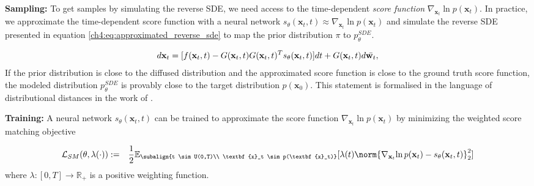 \textbf{Sampling:} To get samples by simulating the reverse SDE, we need access to the time-dependent \textit{score function} $\nabla_{\textbf{x}_t}{\ln{p(\textbf{x}_t)}}$. In practice, we approximate the time-dependent score function with a neural network $s_{\theta}(\textbf{x}_t,t) \approx \nabla_{\textbf{x}_t}{\ln{p(\textbf{x}_t)}}$ and simulate the reverse SDE presented in equation \ref{ch4:eq:approximated_reverse_sde} to map the prior distribution $\pi$ to $p^{SDE}_{\theta}$.

\begin{gather}\label{ch4:eq:approximated_reverse_sde}
d\textbf{x}_t=[f(\textbf{x}_t,t)-G(\textbf{x}_t,t)G(\textbf{x}_t,t)^Ts_{\theta}(\textbf{x}_t,t)]dt + G(\textbf{x}_t,t)d\Bar{\textbf{w}_t},
\end{gather}If the prior distribution is close to the diffused distribution and the approximated score function is close to the ground truth score function, the modeled distribution  $p^{SDE}_{\theta}$ is provably close to the target distribution $p(\textbf{x}_0)$. This statement is formalised in the language of distributional distances in the work of \cite{song2021maximum}. 




\textbf{Training:} A neural network $s_\theta(\textbf{x}_t,t)$ can be trained to approximate the score function $\nabla_{\textbf{x}_t}{\ln{p(\textbf{x}_t)}}$ by minimizing the weighted score matching objective

\begin{gather}
\begin{aligned}
    &\mathcal{L}_{SM}(\theta, \lambda(\cdot)) := 
    &\frac{1}{2} \mathbb{E}_{\subalign{t \sim U(0,T)\\ \textbf{x}_t \sim p(\textbf{x}_t)}} [\lambda(t) \norm{\nabla_{\textbf{x}_t}{\ln{p(\textbf{x}_t)}} - s_\theta(\textbf{x}_t,t)}_2^2]
\end{aligned}
\end{gather}
where $\lambda: [0,T] \xrightarrow{} \mathbb{R}_+$ is a positive weighting function.

